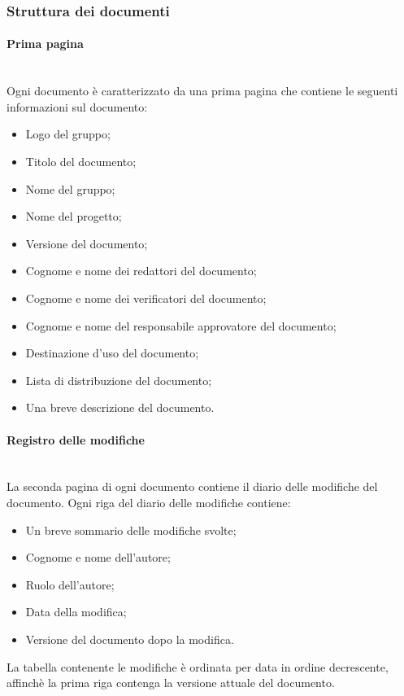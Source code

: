 	\subsubsection{Struttura dei documenti}
	
		\paragraph{Prima pagina}\mbox{} \\
		Ogni documento è caratterizzato da una prima pagina che contiene le seguenti informazioni sul documento:
		\begin{itemize}
			\item Logo del gruppo;
			\item Titolo del documento;
			\item Nome del gruppo;
			\item Nome del progetto;
			\item Versione del documento;
			\item Cognome e nome dei redattori del documento;
			\item Cognome e nome dei verificatori del documento;
			\item Cognome e nome del responsabile approvatore del documento;
			\item Destinazione d’uso del documento;
			\item Lista di distribuzione del documento;
			\item Una breve descrizione del documento.
		\end{itemize}
	
		\paragraph{Registro delle modifiche} \mbox{} \\
		La seconda pagina di ogni documento contiene il diario delle modifiche del documento.
		Ogni riga del diario delle modifiche contiene:
		\begin{itemize}
			\item Un breve sommario delle modifiche svolte;
			\item Cognome e nome dell’autore;
			\item Ruolo dell’autore;
			\item Data della modifica;
			\item Versione del documento dopo la modifica.
		\end{itemize}
		La tabella contenente le modifiche è ordinata per data in ordine decrescente, affinchè la prima riga contenga la versione attuale del documento.
		

